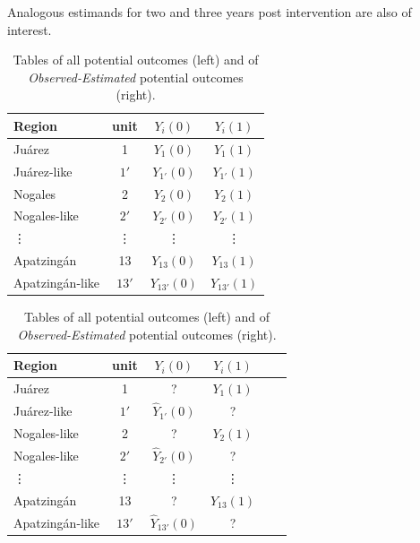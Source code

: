 \documentclass{article}[11 pt]
\begin{document}
				Analogous estimands for two and three years post intervention are also of interest.
						\begin{table}[htdp]
							\centering
						\begin{minipage}[b]{0.3\linewidth}
						    \scriptsize 
					        \begin{tabular}{|l|c|c|c|}
					            \hline
					            Region& unit& $Y_i(0)$&$Y_i(1)$\\
					            \hline
					            Ju\'{a}rez&1&$Y_1(0)$&$Y_1(1)$ \\
								 Ju\'{a}rez-like&$1'$&$Y_{1'}(0)$&$Y_{1'}(1)$ \\
								\hline
								Nogales&2&$Y_2(0)$&$Y_2(1)$ \\
								 	Nogales-like&$2'$&$Y_{2'}(0)$&$Y_{2'}(1)$ \\
								\hline
								\vdots&\vdots&\vdots&\vdots \\
								\hline
					            Apatzing\'{a}n&13&$Y_{13}(0)$&$Y_{13}(1)$ \\
								 Apatzing\'{a}n-like&$13'$&$Y_{{13}'}(0)$&$Y_{{13}'}(1)$  \\
					            \hline

					\end{tabular}
				\end{minipage}
				\hspace{2cm}
				\begin{minipage}[b]{0.3\linewidth}
						    \scriptsize
						        \begin{tabular}{|l|c|c|c|c|c|}
						            \hline
						            Region& unit& $Y_i(0)$&$Y_i(1)$\\
						            \hline
						            Ju\'{a}rez&1&?&$Y_1(1)$ \\
									 Ju\'{a}rez-like&$1'$&$\hat{Y}_{1'}(0)$&? \\
									\hline
									Nogales-like&2&?&$Y_2(1)$ \\
										Nogales-like &$2'$&$\hat{Y}_{2'}(0)$&? \\
										\hline
									\vdots&\vdots&\vdots&\vdots \\
									\hline
						            Apatzing\'{a}n&13&?&$Y_{13}(1)$ \\
									 Apatzing\'{a}n-like&$13'$&$\hat{Y}_{13'}(0)$&? \\
						            \hline
						        \end{tabular}

									\end{minipage}
									   \caption{Tables of all potential outcomes (left)  and of \emph{Observed-Estimated} potential outcomes (right).}
				    \label{Tab3}
				\end{table}
\end{document}
